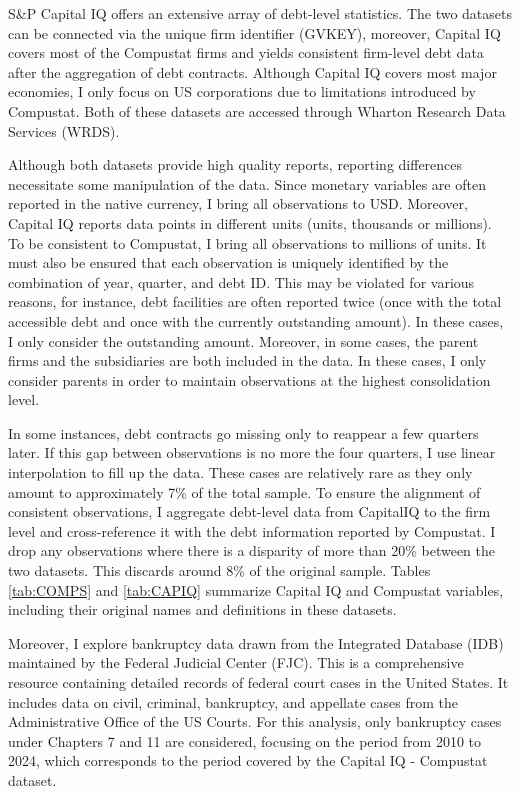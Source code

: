 \documentclass[12pt]{article}
\begin{document}
S\&P Capital IQ offers an extensive array of debt-level statistics. The two datasets can be connected via the unique firm identifier (GVKEY), moreover, Capital IQ covers most of the Compustat firms and yields consistent firm-level debt data after the aggregation of debt contracts. Although Capital IQ covers most major economies, I only focus on US corporations due to limitations introduced by Compustat. Both of these datasets are accessed through Wharton Research Data Services (WRDS). 

Although both datasets provide high quality reports, reporting differences necessitate some manipulation of the data. Since monetary variables are often reported in the native currency, I bring all observations to USD. Moreover, Capital IQ reports data points in different units (units, thousands or millions). To be consistent to Compustat, I bring all observations to millions of units. It must also be ensured that each observation is uniquely identified by the combination of year, quarter, and debt ID. This may be violated for various reasons, for instance, debt facilities are often reported twice (once with the total accessible debt and once with the currently outstanding amount). In these cases, I only consider the outstanding amount. Moreover, in some cases, the parent firms and the subsidiaries are both included in the data. In these cases, I only consider parents in order to maintain observations at the highest consolidation level. 

In some instances, debt contracts go missing only to reappear a few quarters later. If this gap between observations is no more the four quarters, I use linear interpolation to fill up the data. These cases are relatively rare as they only amount to approximately 7\% of the total sample. To ensure the alignment of consistent observations, I aggregate debt-level data from CapitalIQ to the firm level and cross-reference it with the debt information reported by Compustat. I drop any observations where there is a disparity of more than 20\% between the two datasets. This discards around 8\% of the original sample. Tables \ref{tab:COMPS} and \ref{tab:CAPIQ} summarize Capital IQ and Compustat variables, including their original names and definitions in these datasets. 

Moreover, I explore bankruptcy data drawn from the Integrated Database (IDB) maintained by the Federal Judicial Center (FJC). This is a comprehensive resource containing detailed records of federal court cases in the United States. It includes data on civil, criminal, bankruptcy, and appellate cases from the Administrative Office of the US Courts. For this analysis, only bankruptcy cases under Chapters 7 and 11 are considered, focusing on the period from 2010 to 2024, which corresponds to the period covered by the Capital IQ - Compustat dataset. 
\end{document}
